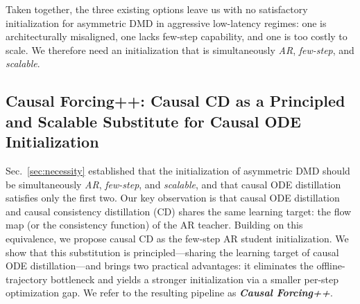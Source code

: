 \documentclass{llmxive}
\begin{document}
Taken together, the three existing options leave us with no satisfactory initialization for asymmetric DMD in aggressive low-latency regimes: one is architecturally misaligned, one lacks few-step capability, and one is too costly to scale. We therefore need an initialization that is simultaneously \emph{AR}, \emph{few-step}, and \emph{scalable}. 

\subsection{Causal Forcing++: Causal CD as a Principled and Scalable Substitute for Causal ODE Initialization}
\label{sec:substitute}

Sec.~\ref{sec:necessity} established that the initialization of asymmetric DMD should be simultaneously \emph{AR}, \emph{few-step}, and \emph{scalable}, and that causal ODE distillation~\cite{zhu2026causal} satisfies only the first two. Our key observation is that causal ODE distillation and causal consistency distillation (CD) shares the same learning target: the flow map (or the consistency function) of the AR teacher. Building on this equivalence, we propose causal CD as the few-step AR student initialization. We show that this substitution is principled---sharing the learning target of causal ODE distillation---and brings two practical advantages: it eliminates the offline-trajectory bottleneck and yields a stronger initialization via a smaller per-step optimization gap. We refer to the resulting pipeline as \textbf{\textit{Causal Forcing++}}.
\end{document}
